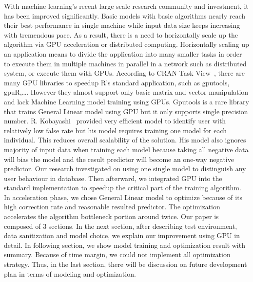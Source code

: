 \documentclass[English]{dicomopapers}
\begin{document}
  With machine learning's recent large scale research community and investment, it has been improved significantly. Basic models with basic algorithms nearly reach their best performance in single machine while input data size keeps increasing with tremendous pace. As a result, there is a need to horizontally scale up the algorithm via GPU acceleration or distributed computing. Horizontally scaling up an application means to divide the application into many smaller tasks in order to execute them in multiple machines in parallel in a network such as distributed system, or execute them with GPUs. According to CRAN Task View~\cite{cran_task}, there are many GPU libraries to speedup R's standard application, such as gputools, gpuR,\ldots. However they almost support only basic matrix and vector manipulation and lack Machine Learning model training using GPUs. Gputools is a rare library that trains General Linear model using GPU but it only supports single precision number. R. Kobayashi~\cite{kobayashi1} provided very efficient model to identify user with relatively low false rate but his model requires training one model for each individual. This reduces overall scalability of the solution. His model also ignores majority of input data when training each model because taking all negative data will bias the model and the result predictor will become an one-way negative predictor.\newline
	Our research investigated on using one single model to distinguish any user behaviour in database. Then afterward, we integrated GPU into the standard implementation to speedup the critical part of the training algorithm. In acceleration phase, we chose General Linear model to optimize because of its high correction rate and reasonable resulted predictor. The optimization accelerates the algorithm bottleneck portion around twice.\newline
	Our paper is composed of 3 sections. In the next section, after describing test environment, data sanitization and model choice, we explain our improvement using GPU in detail. In following section, we show model training and optimization result with summary. Because of time margin, we could not implement all optimization strategy. Thus, in the last section, there will be discussion on future development plan in terms of modeling and optimization.
\end{document}
